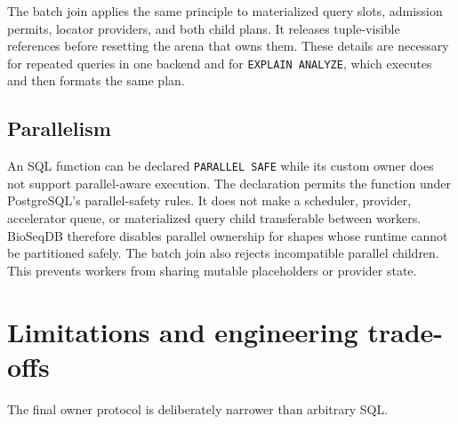 The batch join applies the same principle to materialized query slots,
admission permits, locator providers, and both child plans.  It releases
tuple-visible references before resetting the arena that owns them.  These
details are necessary for repeated queries in one backend and for
\texttt{EXPLAIN ANALYZE}, which executes and then formats the same plan.

\subsection{Parallelism}

An SQL function can be declared \texttt{PARALLEL SAFE} while its custom owner
does not support parallel-aware execution.  The declaration permits the
function under PostgreSQL's parallel-safety rules.  It does not make a
scheduler, provider, accelerator queue, or materialized query child
transferable between workers.  BioSeqDB therefore disables parallel ownership
for shapes whose runtime cannot be partitioned safely.  The batch join also
rejects incompatible parallel children.  This prevents workers from sharing
mutable placeholders or provider state.

\section{Limitations and engineering trade-offs}
\label{sec:customscan-limitations}

The final owner protocol is deliberately narrower than arbitrary SQL.

